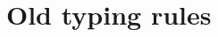 \documentclass[11pt]{article}
\newcommand\name[1]{\ensuremath{\mathit{#1}}}
\newcommand\<\:                 %
\newcommand\fnspace{\<}         %
\newcommand\fn[1]{\lambda{#1}.\fnspace}
\newcommand\ex[1]{\exists{#1}.\fnspace}
\newcommand\with{\mathbin{\&}}
\newcommand\ox\otimes
\newcommand\G{\mathrm{\Gamma}}
\renewcommand\O{\mathrm{\Omega}}
\renewcommand\L{\mathrm{\Lambda}}
\renewcommand\G\Gamma
\renewcommand\O\Omega
\renewcommand\L{\Lambda}
\newcommand\phyp[2]{{#1} \dblcolon {#2}} %
\newcommand\kword[1]{\ensuremath{\textrm{#1}}}
\newcommand\letin[1]{\kword{let}~{#1}~\kword{in}~}
\newcommand\leteq[2]{\letin{{#1} = {#2}}}
\newcommand\letpair[4]{\leteq{({#1}, {#2})}{#3}{#4}}
\newcommand\withpair[1]{\ensuremath{\langle{#1}\rangle}}
\newcommand\many\top
\newcommand\mand\wedge
\newcommand\mto\to              %
\newcommand\mentails\vdash
\newcommand\mfun[3]{{#1}_{#2} \!\to {#3}}
\renewcommand\mfun[3]{{#1} \overset{#2}{\to} {#3}}
\newcommand\multiarg[1]{({#1})}
\newcommand\multiapp[2]{{#1}\<\multiarg{#2}}
\DeclareMathOperator{\dom}{dom}
\DeclareMathOperator{\nils}{pp}
\DeclareMathOperator{\mode}{mode}
\newcommand\modeof\mode
\DeclareMathOperator\fv{fv}
\begin{document}






\section{Old typing rules}

\newcommand\ground{\name{ground}}
\end{document}
